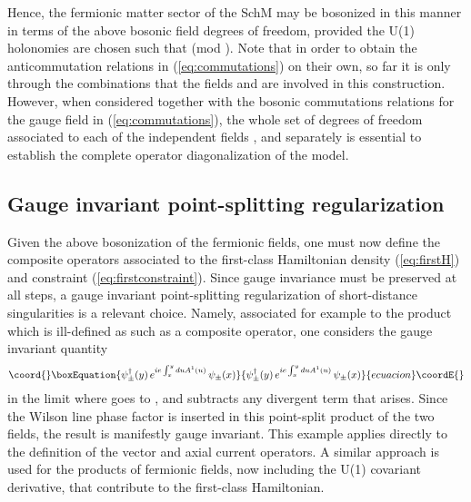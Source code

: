 \documentclass[a4paper,11pt]{article}
\def\Z{\mathbb Z}
\begin{document}
Hence, the fermionic matter sector of the SchM may be bosonized in 
this manner in terms of the above bosonic field degrees of freedom, provided
the U(1) holonomies \myHighlight{$\lambda_\pm$}\coordHE{} are chosen such that 
\myHighlight{$\lambda_\pm=\lambda\alpha_\pm$}\coordHE{} (mod \myHighlight{$\Z$}\coordHE{}). Note that in order to obtain the 
anticommutation relations in (\ref{eq:commutations}) on their own,
so far it is only through the combinations 
\coordHE{} that the fields \coordHE{} and 
\coordHE{} are involved in this construction. However, when considered
together with the bosonic commutations relations for the gauge field
in (\ref{eq:commutations}), the whole set of degrees of freedom associated
to each of the independent fields \coordHE{}, \coordHE{} and 
\coordHE{} separately is essential to establish the complete operator 
diagonalization of the model.

\subsection{Gauge invariant point-splitting regularization}

Given the above bosonization of the fermionic fields, one must now
define the composite operators associated to the first-class Hamiltonian
density (\ref{eq:firstH}) and constraint (\ref{eq:firstconstraint}).
Since gauge invariance must be preserved at all steps, a gauge invariant
point-splitting regularization of short-distance singularities is a
relevant choice. Namely, associated for example to the product 
\coordHE{} which is ill-defined as such as a composite
operator, one considers the gauge invariant quantity
\begin{equation}\coord{}\boxEquation{
\psi^\dagger_\pm(y)\,e^{ie\int_x^y du A^1(u)}\,\psi_\pm(x)
}{
\psi^\dagger_\pm(y)\,e^{ie\int_x^y du A^1(u)}\,\psi_\pm(x)
}{ecuacion}\coordE{}\end{equation}
in the limit where \coordHE{} goes to \coordHE{}, and subtracts any divergent term
that arises. Since the Wilson line phase factor is inserted in this
point-split product of the two fields, the result is manifestly gauge invariant.
This example applies directly to the definition of the vector and axial
current operators. A similar approach is used for the products of fermionic
fields, now including the U(1) covariant derivative, that contribute to the
first-class Hamiltonian.
\end{document}
